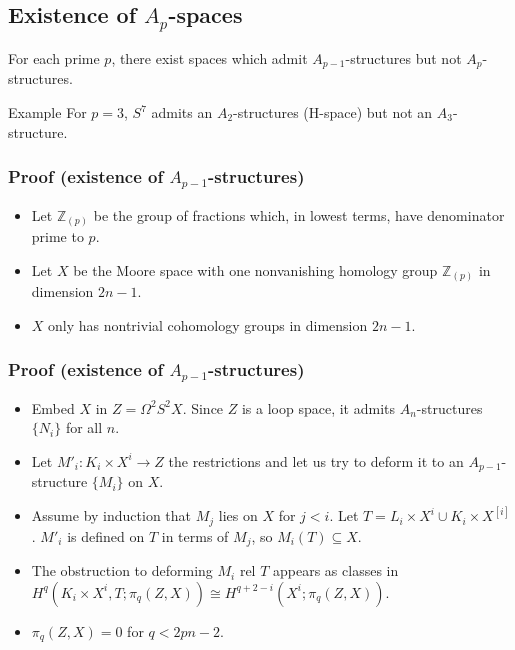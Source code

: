 \documentclass{beamer}
\theoremstyle{definition}
\newcommand{\Z}{\mathbb{Z}}
\begin{document}
\subsection{Existence of $A_p$-spaces}
\begin{frame}[fragile]
\begin{theorem}
For each prime $p$, there exist spaces which admit $A_{p-1}$-structures but not $A_p$-structures.
\end{theorem}\pause
\begin{block}{Example}
For $p=3$, $S^7$ admits an $A_2$-structures (H-space) but not an $A_3$-structure.
\end{block}
\end{frame}
\begin{frame}
\frametitle{Proof (existence of $A_{p-1}$-structures)}
\begin{itemize}
\item<1-> Let $\Z_{(p)}$ be the group of fractions which, in lowest terms, have denominator prime to $p$. %
\item<2-> Let $X$ be the Moore space with one nonvanishing homology group $\Z_{(p)}$ in dimension $2n-1$. %
\item<3-> $X$ only has nontrivial cohomology groups in dimension $2n-1$.
\end{itemize}
\end{frame}
\begin{frame}
\frametitle{Proof (existence of $A_{p-1}$-structures)}
\begin{itemize}
\item<1-> Embed $X$ in $Z=\Omega^2S^2X$. Since $Z$ is a loop space, it admits $A_n$-structures $\{N_i\}$ for all $n$.
\item<2-> Let $M'_i:K_i\times X^i\to Z$ the restrictions and let us try to deform it to an $A_{p-1}$-structure $\{M_i\}$ on $X$.
\item<3-> Assume by induction that $M_j$ lies on $X$ for $j<i$. Let $T=L_i\times X^i\cup K_i\times X^{[i]}$. $M'_i$ is defined on $T$ in terms of $M_j$, so $M_i(T)\subseteq X$. %
\item<4-> The obstruction to deforming $M_i$ rel $T$ appears as classes in $H^q(K_i\times X^i,T;\pi_q(Z,X))\cong H^{q+2-i}(X^i;\pi_q(Z,X))$.
\item<5-> $\pi_q(Z,X)=0$ for $q<2pn-2$.

\end{itemize}
\end{frame}
\end{document}
